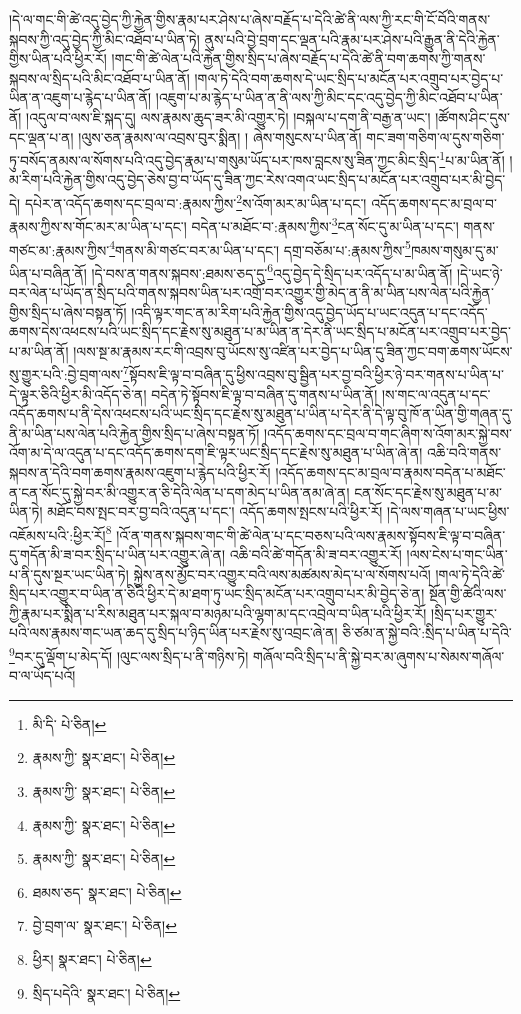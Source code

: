།དེ་ལ་གང་གི་ཚེ་འདུ་བྱེད་ཀྱི་རྐྱེན་གྱིས་རྣམ་པར་ཤེས་པ་ཞེས་བརྗོད་པ་དེའི་ཚེ་ནི་ལས་ཀྱི་རང་གི་ངོ་བོའི་གནས་སྐབས་ཀྱི་འདུ་བྱེད་ཀྱི་མིང་འཐོབ་པ་ཡིན་ཏེ། ནུས་པའི་བྱེ་བྲག་དང་ལྡན་པའི་རྣམ་པར་ཤེས་པའི་རྒྱུན་ནི་དེའི་རྐྱེན་གྱིས་ཡིན་པའི་ཕྱིར་རོ། །གང་གི་ཚེ་ལེན་པའི་རྐྱེན་གྱིས་སྲིད་པ་ཞེས་བརྗོད་པ་དེའི་ཚེ་ནི་བག་ཆགས་ཀྱི་གནས་སྐབས་ལ་སྲིད་པའི་མིང་འཐོབ་པ་ཡིན་ནོ། །གལ་ཏེ་དེའི་བག་ཆགས་དེ་ཡང་སྲིད་པ་མངོན་པར་འགྲུབ་པར་བྱེད་པ་ཡིན་ན་འཇུག་པ་རྙེད་པ་ཡིན་ནོ། །འཇུག་པ་མ་རྙེད་པ་ཡིན་ན་ནི་ལས་ཀྱི་མིང་དང་འདུ་བྱེད་ཀྱི་མིང་འཐོབ་པ་ཡིན་ནོ། །འདུལ་བ་ལས་ཇི་སྐད་དུ། ལས་རྣམས་ཆུད་ཟར་མི་འགྱུར་ཏེ། །བསྐལ་པ་དག་ནི་བརྒྱ་ན་ཡང་། །ཚོགས་ཤིང་དུས་དང་ལྡན་པ་ན། །ལུས་ཅན་རྣམས་ལ་འབྲས་བུར་སྨིན། །
ཞེས་གསུངས་པ་ཡིན་ནོ། གང་ཟག་གཅིག་ལ་དུས་གཅིག་ཏུ་བསོད་ནམས་ལ་སོགས་པའི་འདུ་བྱེད་རྣམ་པ་གསུམ་ཡོད་པར་ཁས་བླངས་སུ་ཟིན་ཀྱང་མིང་སྲིད་\footnote{མི་ིད་  པེ་ཅིན། }པ་མ་ཡིན་ནོ། །མ་རིག་པའི་རྐྱེན་གྱིས་འདུ་བྱེད་ཅེས་བྱ་བ་ཡོད་དུ་ཟིན་ཀྱང་རེས་འགའ་ཡང་སྲིད་པ་མངོན་པར་འགྲུབ་པར་མི་བྱེད་དེ། དཔེར་ན་འདོད་ཆགས་དང་བྲལ་བ་:རྣམས་ཀྱིས་\footnote{རྣམས་ཀྱི་  སྣར་ཐང་།  པེ་ཅིན། }ས་འོག་མར་མ་ཡིན་པ་དང་། འདོད་ཆགས་དང་མ་བྲལ་བ་རྣམས་ཀྱིས་ས་གོང་མར་མ་ཡིན་པ་དང་། བདེན་པ་མཐོང་བ་:རྣམས་ཀྱིས་\footnote{རྣམས་ཀྱི་  སྣར་ཐང་།  པེ་ཅིན། }ངན་སོང་དུ་མ་ཡིན་པ་དང་། གནས་གཙང་མ་:རྣམས་ཀྱིས་\footnote{རྣམས་ཀྱི་  སྣར་ཐང་།  པེ་ཅིན། }གནས་མི་གཙང་བར་མ་ཡིན་པ་དང་། དགྲ་བཅོམ་པ་:རྣམས་ཀྱིས་\footnote{རྣམས་ཀྱི་  སྣར་ཐང་།  པེ་ཅིན། }ཁམས་གསུམ་དུ་མ་ཡིན་པ་བཞིན་ནོ། །དེ་བས་ན་གནས་སྐབས་:ཐམས་ཅད་དུ་\footnote{ཐམས་ཅད་  སྣར་ཐང་།  པེ་ཅིན། }འདུ་བྱེད་དེ་སྲིད་པར་འདོད་པ་མ་ཡིན་ནོ། །དེ་ཡང་ཉེ་བར་ལེན་པ་ཡོད་ན་སྲིད་པའི་གནས་སྐབས་ཡིན་པར་འགྲོ་བར་འགྱུར་གྱི་མེད་ན་ནི་མ་ཡིན་པས་ལེན་པའི་རྐྱེན་གྱིས་སྲིད་པ་ཞེས་བསྟན་ཏོ། །འདི་ལྟར་གང་ན་མ་རིག་པའི་རྐྱེན་གྱིས་འདུ་བྱེད་ཡོད་པ་ཡང་འདུན་པ་དང་འདོད་ཆགས་དེས་འཕངས་པའི་ཡང་སྲིད་དང་རྗེས་སུ་མཐུན་པ་མ་ཡིན་ན་དེར་ནི་ཡང་སྲིད་པ་མངོན་པར་འགྲུབ་པར་བྱེད་པ་མ་ཡིན་ནོ། །ལས་སྔ་མ་རྣམས་རང་གི་འབྲས་བུ་ཡོངས་སུ་འཛིན་པར་བྱེད་པ་ཡིན་དུ་ཟིན་ཀྱང་བག་ཆགས་ཡོངས་སུ་གྱུར་པའི་:བྱེ་བྲག་ལས་\footnote{བྱེ་བྲག་ལ་  སྣར་ཐང་།  པེ་ཅིན། }སྟོབས་ཇི་ལྟ་བ་བཞིན་དུ་ཕྱིས་འབྲས་བུ་སྦྱིན་པར་བྱ་བའི་ཕྱིར་ཉེ་བར་གནས་པ་ཡིན་པ་དེ་ལྟར་ཅིའི་ཕྱིར་མི་འདོད་ཅེ་ན། བདེན་ཏེ་སྟོབས་ཇི་ལྟ་བ་བཞིན་དུ་གནས་པ་ཡིན་ནོ། །ས་གང་ལ་འདུན་པ་དང་འདོད་ཆགས་པ་ནི་དེས་འཕངས་པའི་ཡང་སྲིད་དང་རྗེས་སུ་མཐུན་པ་ཡིན་པ་དེར་ནི་དེ་ལྟ་བུ་ཁོ་ན་ཡིན་གྱི་གཞན་དུ་ནི་མ་ཡིན་པས་ལེན་པའི་རྐྱེན་གྱིས་སྲིད་པ་ཞེས་བསྟན་ཏོ། །འདོད་ཆགས་དང་བྲལ་བ་གང་ཞིག་ས་འོག་མར་སྐྱེ་བས་འོག་མ་དེ་ལ་འདུན་པ་དང་འདོད་ཆགས་དག་ཇི་ལྟར་ཡང་སྲིད་དང་རྗེས་སུ་མཐུན་པ་ཡིན་ཞེ་ན། འཆི་བའི་གནས་སྐབས་ན་དེའི་བག་ཆགས་རྣམས་འཇུག་པ་རྙེད་པའི་ཕྱིར་རོ། །འདོད་ཆགས་དང་མ་བྲལ་བ་རྣམས་བདེན་པ་མཐོང་ན་ངན་སོང་དུ་སྐྱེ་བར་མི་འགྱུར་ན་ཅི་དེའི་ལེན་པ་དག་མེད་པ་ཡིན་ནམ་ཞེ་ན། ངན་སོང་དང་རྗེས་སུ་མཐུན་པ་མ་ཡིན་ཏེ། མཐོང་བས་སྤང་བར་བྱ་བའི་འདུན་པ་དང་། འདོད་ཆགས་སྤངས་པའི་ཕྱིར་རོ། །དེ་ལས་གཞན་པ་ཡང་ཕྱིས་འཇོམས་པའི་:ཕྱིར་རོ།\footnote{ཕྱིར།  སྣར་ཐང་།  པེ་ཅིན། } །འོ་ན་གནས་སྐབས་གང་གི་ཚེ་ལེན་པ་དང་བཅས་པའི་ལས་རྣམས་སྟོབས་ཇི་ལྟ་བ་བཞིན་དུ་གདོན་མི་ཟ་བར་སྲིད་པ་ཡིན་པར་འགྱུར་ཞེ་ན། འཆི་བའི་ཚེ་གདོན་མི་ཟ་བར་འགྱུར་རོ། །ལས་ངེས་པ་གང་ཡིན་པ་ནི་དུས་སྔར་ཡང་ཡིན་ཏེ། སྐྱེས་ནས་མྱོང་བར་འགྱུར་བའི་ལས་མཚམས་མེད་པ་ལ་སོགས་པའོ། །གལ་ཏེ་དེའི་ཚེ་སྲིད་པར་འགྱུར་བ་ཡིན་ན་ཅིའི་ཕྱིར་དེ་མ་ཐག་ཏུ་ཡང་སྲིད་མངོན་པར་འགྲུབ་པར་མི་བྱེད་ཅེ་ན། སྔོན་གྱི་ཚེའི་ལས་ཀྱི་རྣམ་པར་སྨིན་པ་རིས་མཐུན་པར་སྐལ་བ་མཉམ་པའི་ལྷག་མ་དང་འབྲེལ་བ་ཡིན་པའི་ཕྱིར་རོ། །སྲིད་པར་གྱུར་པའི་ལས་རྣམས་གང་ཡན་ཆད་དུ་སྲིད་པ་ཉིད་ཡིན་པར་རྗེས་སུ་འབྲང་ཞེ་ན། ཅི་ཙམ་ན་སྐྱེ་བའི་:སྲིད་པ་ཡིན་པ་དེའི་\footnote{སྲིད་པདེའི་  སྣར་ཐང་།  པེ་ཅིན། }བར་དུ་ལྡོག་པ་མེད་དོ། །ལུང་ལས་སྲིད་པ་ནི་གཉིས་ཏེ། གཞོལ་བའི་སྲིད་པ་ནི་སྐྱེ་བར་མ་ཞུགས་པ་སེམས་གཞོལ་བ་ལ་ཡོད་པའོ། 